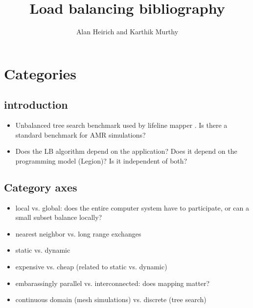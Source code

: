 \documentclass{article}
\begin{document}
\title{Load balancing bibliography}
\author{Alan Heirich and Karthik Murthy}

\maketitle

\section{Categories}

\subsection{introduction}

\begin{itemize}
\item
Unbalanced tree search benchmark used by lifeline mapper
\cite{Saraswat:2011:LGL:1941553.1941582}.
Is there a standard benchmark for AMR simulations?

\item
Does the LB algorithm depend on the application?  Does it depend on the programming model (Legion)?  Is it independent of both?

\end{itemize}

\subsection{Category axes}

\begin{itemize}
\item
local vs. global: does the entire computer system have to participate, or can a small subset balance locally?

\item
nearest neighbor vs. long range exchanges

\item 
static vs. dynamic

\item
expensive vs. cheap (related to static vs. dynamic)

\item
embarassingly parallel vs. interconnected: does mapping matter?

\item
continuous domain (mesh simulations) vs. discrete (tree search)

\end{itemize}
\end{document}
